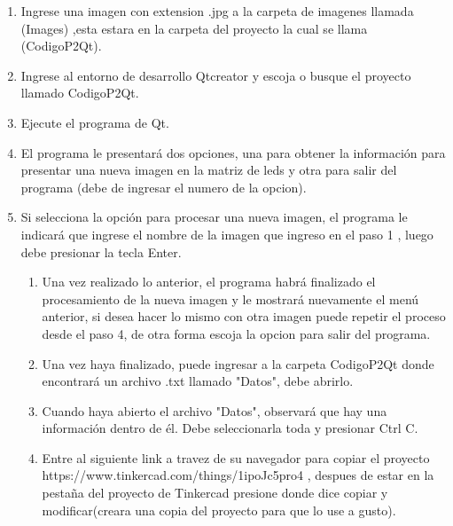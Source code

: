 \documentclass{article}
\begin{document}
  \begin{enumerate}
  
        \item Ingrese una imagen con extension .jpg a la carpeta de imagenes llamada  (Images) ,esta estara en la carpeta del proyecto la cual se llama (CodigoP2Qt).
        
        \item Ingrese al entorno de desarrollo Qtcreator y escoja o busque el proyecto llamado CodigoP2Qt.\\
        
        \item Ejecute el programa de Qt.\\ 
         
        \item El programa le presentará dos opciones, una para obtener la información para presentar una nueva imagen en la matriz de leds y otra para salir del programa (debe de ingresar el numero de la opcion).\\
         
         \item Si selecciona la opción para procesar una nueva imagen, el programa le indicará que ingrese el nombre de la imagen que ingreso en el paso 1 , luego debe presionar la tecla Enter.\\
         
         \begin{enumerate}
         
         \item Una vez realizado lo anterior, el programa habrá finalizado el procesamiento de la nueva imagen y le mostrará nuevamente el menú anterior, si desea hacer lo mismo con otra imagen puede repetir el proceso desde el paso 4, de otra forma escoja la opcion para salir del programa.\\
    
        \item Una vez haya finalizado, puede ingresar a la carpeta CodigoP2Qt donde encontrará un archivo .txt llamado "Datos", debe abrirlo.\\
        
        \item Cuando haya abierto el archivo "Datos",  observará que hay una información dentro de él. Debe seleccionarla toda y presionar Ctrl C.\\ 
        
        \item Entre al siguiente link a travez de su navegador para copiar el proyecto https://www.tinkercad.com/things/1ipoJc5pro4 , despues de estar en la pestaña del proyecto de Tinkercad presione donde dice copiar y modificar(creara una copia del proyecto para que lo use a gusto).\\


\end{enumerate}
\end{enumerate}
\end{document}
